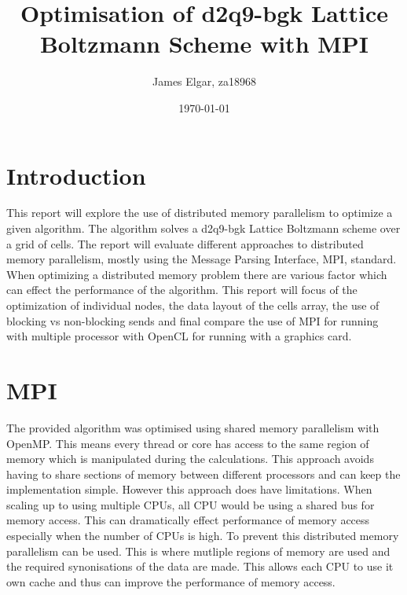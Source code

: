 \documentclass{article}
\title{Optimisation of d2q9-bgk Lattice Boltzmann Scheme with MPI}
\author{James Elgar, za18968}
\date{\today}
\begin{document}
\begin{multicols}{2}

\maketitle

\section{Introduction}

This report will explore the use of distributed memory parallelism to optimize
a given algorithm. The algorithm solves a d2q9-bgk Lattice Boltzmann scheme
over a grid of cells. The report will evaluate different approaches to
distributed memory parallelism, mostly using the Message Parsing Interface,
MPI, standard. When optimizing a distributed memory problem there are various
factor which can effect the performance of the algorithm. This report will
focus of the optimization of individual nodes, the data layout of the cells
array, the use of blocking vs non-blocking sends and final compare the use of
MPI for running with multiple processor with OpenCL for running with a graphics
card.

\section{MPI}

The provided algorithm was optimised using shared memory parallelism with
OpenMP. This means every thread or core has access to the same region of memory
which is manipulated during the calculations. This approach avoids having to
share sections of memory between different processors and can keep the
implementation simple. However this approach does have limitations. When
scaling up to using multiple CPUs, all CPU would be using a shared bus for
memory access. This can dramatically effect performance of memory access
especially when the number of CPUs is high. To prevent this distributed memory
parallelism can be used. This is where mutliple regions of memory are used and
the required synonisations of the data are made. This allows each CPU to use it
own cache and thus can improve the performance of memory access.


\end{multicols}
\end{document}
